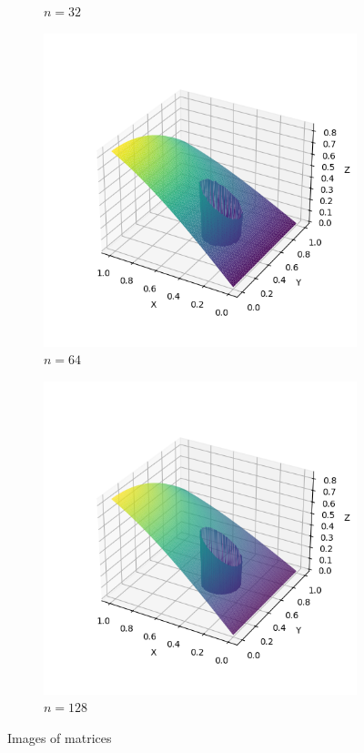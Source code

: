 \documentclass[lang=cn,a4paper,newtx,bibend=bibtex]{elegantpaper}
\begin{document}
\begin{figure}[H]
\begin{subfigure}[b]{0.18\textwidth}
      \caption{$n = 32$}
  \end{subfigure}
  \hfill
  \begin{subfigure}[b]{0.18\textwidth}
      \includegraphics[width=\textwidth]{../../res_bac/res-[data|2-Dirichlet-irregular-d64].png}
      \caption{$n = 64$}
  \end{subfigure}
  \hfill
  \begin{subfigure}[b]{0.18\textwidth}
      \includegraphics[width=\textwidth]{../../res_bac/res-[data|2-Dirichlet-irregular-e128].png}
      \caption{$n = 128$}
  \end{subfigure}
  \caption{Images of matrices}\label{fig:matrices}
\end{figure}
\end{document}
